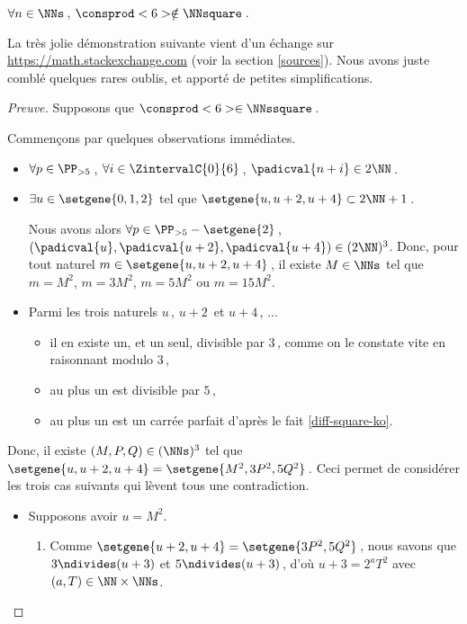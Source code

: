 \begin{fact} \label{case-7}
	 $\forall n \in \NNs$\,, $\consprod<6> \notin \NNsquare$\,.
\end{fact}




La très jolie démonstration suivante vient d'un échange sur \url{https://math.stackexchange.com} (voir la section \ref{sources}). Nous avons juste comblé quelques rares oublis, et apporté de petites simplifications.
	

\begin{proof}[Preuve]
	Supposons que $\consprod<6> \in \NNssquare$\,.
	
	\smallskip
	
	Commençons par quelques observations immédiates.
    \begin{itemize}
    	\item  
		$\forall p \in \PP_{>5}$\,, 
   		$\forall i \in \ZintervalC{0}{6}$\,, 
    	$\padicval{n + i} \in 2 \NN$\,.
	
	
		\item $\exists u \in \setgene{0, 1, 2}$ tel que $\setgene{u, u + 2, u + 4} \subset 2 \NN + 1$\,.
		
		\noindent
		Nous avons alors
		$\forall p \in \PP_{>5} - \setgene{2}$\,, 
   		$(\padicval{u}, \padicval{u+2}, \padicval{u+4}) \in ( 2 \NN )^3$.
		Donc, pour tout naturel $m \in \setgene{u, u + 2, u + 4}$\,, 
		il existe $M \in \NNs$ tel que 
		$m = M^2$, $m = 3 M^2$, $m = 5 M^2$ ou $m = 15 M^2$.
	
	
		\item Parmi les trois naturels $u$\,, $u + 2$\, et $u + 4$\,, ...
		\begin{itemize}
    		\item il en existe un, et un seul, divisible par $3$\,, comme on le constate vite en raisonnant modulo $3$\,,

    		\item au plus un est divisible par $5$\,,

    		\item au plus un est un carrée parfait d'après le fait \ref{diff-square-ko}.
		\end{itemize}
    \end{itemize}

    \smallskip
	
	Donc, il existe $(M, P, Q) \in ( \NNs )^3$ tel que 
    $\setgene{u, u + 2, u + 4} = \setgene{M^2, 3P^2, 5Q^2}$\,.
    Ceci permet de considérer les trois cas suivants qui lèvent tous une contradiction.
    \begin{itemize}
    	\item Supposons avoir $u = M^2$.
		\begin{enumerate}
			\item Comme $\setgene{u + 2, u + 4} = \setgene{3P^2, 5Q^2}$\,, nous savons que $3 \ndivides (u + 3)$ et $5 \ndivides (u + 3)$\,, d'où $u + 3 = 2^a T^2$ avec $(a, T) \in \NN \times \NNs$.


\end{enumerate}
\end{itemize}
\end{proof}
